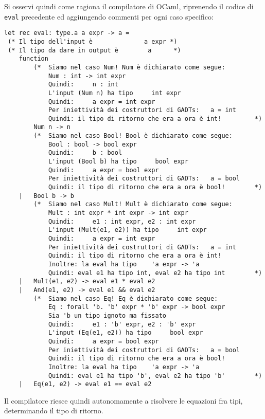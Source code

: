 \documentclass{article}
\begin{document}
Si osservi quindi come ragiona il compilatore di OCaml, riprenendo il codice di \texttt{eval} precedente ed aggiungendo commenti per ogni caso specifico:
\begin{tcolorbox}
\begin{verbatim}
let rec eval: type.a a expr -> a =
 (* Il tipo dell'input è              a expr *)
 (* Il tipo da dare in output è        a      *)
    function
        (*  Siamo nel caso Num! Num è dichiarato come segue:
            Num : int -> int expr
            Quindi:     n : int
            L'input (Num n) ha tipo     int expr
            Quindi:     a expr = int expr
            Per iniettività dei costruttori di GADTs:   a = int
            Quindi: il tipo di ritorno che era a ora è int!         *)
        Num n -> n
        (*  Siamo nel caso Bool! Bool è dichiarato come segue:
            Bool : bool -> bool expr
            Quindi:     b : bool
            L'input (Bool b) ha tipo     bool expr
            Quindi:     a expr = bool expr
            Per iniettività dei costruttori di GADTs:   a = bool
            Quindi: il tipo di ritorno che era a ora è bool!        *)
    |   Bool b -> b
        (*  Siamo nel caso Mult! Mult è dichiarato come segue:
            Mult : int expr * int expr -> int expr
            Quindi:     e1 : int expr, e2 : int expr
            L'input (Mult(e1, e2)) ha tipo     int expr
            Quindi:     a expr = int expr
            Per iniettività dei costruttori di GADTs:   a = int
            Quindi: il tipo di ritorno che era a ora è int! 
            Inoltre: la eval ha tipo    'a expr -> 'a 
            Quindi: eval e1 ha tipo int, eval e2 ha tipo int        *)
    |   Mult(e1, e2) -> eval e1 * eval e2
    |   And(e1, e2) -> eval e1 && eval e2
        (*  Siamo nel caso Eq! Eq è dichiarato come segue:
            Eq : forall 'b. 'b' expr * 'b' expr -> bool expr
            Sia 'b un tipo ignoto ma fissato
            Quindi:     e1 : 'b' expr, e2 : 'b' expr
            L'input (Eq(e1, e2)) ha tipo     bool expr
            Quindi:     a expr = bool expr
            Per iniettività dei costruttori di GADTs:   a = bool
            Quindi: il tipo di ritorno che era a ora è bool! 
            Inoltre: la eval ha tipo    'a expr -> 'a 
            Quindi: eval e1 ha tipo 'b', eval e2 ha tipo 'b'        *)
    |   Eq(e1, e2) -> eval e1 == eval e2
\end{verbatim}
\end{tcolorbox}
Il compilatore riesce quindi autonomamente a risolvere le equazioni fra tipi, determinando il tipo di ritorno.
\end{document}

